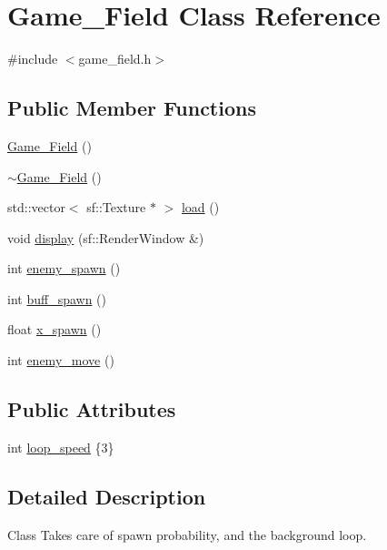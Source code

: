 \hypertarget{classGame__Field}{}\section{Game\+\_\+\+Field Class Reference}
\label{classGame__Field}


{\ttfamily \#include $<$game\+\_\+field.\+h$>$}

\subsection*{Public Member Functions}
\begin{DoxyCompactItemize}
\item 
\hyperlink{classGame__Field_aa62311d75d2c83c069535ca310b7585d}{Game\+\_\+\+Field} ()
\item 
\hyperlink{classGame__Field_a1cc20d15758ae0d3e31492448bc4d47f}{$\sim$\+Game\+\_\+\+Field} ()
\item 
std\+::vector$<$ sf\+::\+Texture $\ast$ $>$ \hyperlink{classGame__Field_ad2f37858f33af0caf2cd4ba0107a9a24}{load} ()
\item 
void \hyperlink{classGame__Field_a60de25cfcba5f7f67a5bf510cdc13326}{display} (sf\+::\+Render\+Window \&)
\item 
int \hyperlink{classGame__Field_a2a328d2a97c5f90a2cd35a89e1cedb01}{enemy\+\_\+spawn} ()
\item 
int \hyperlink{classGame__Field_a8f7d0feefd13f9ba229e08d4e270528d}{buff\+\_\+spawn} ()
\item 
float \hyperlink{classGame__Field_a6ccee168fe4ca574f3b9de452cecc38c}{x\+\_\+spawn} ()
\item 
int \hyperlink{classGame__Field_ae174d69a829b073c9b64e9f15e57870d}{enemy\+\_\+move} ()
\end{DoxyCompactItemize}
\subsection*{Public Attributes}
\begin{DoxyCompactItemize}
\item 
int \hyperlink{classGame__Field_a3d3cda2cf3a0eae2229f5b4a6e0ae532}{loop\+\_\+speed} \{3\}
\end{DoxyCompactItemize}


\subsection{Detailed Description}
Class Takes care of spawn probability, and the background loop. 

